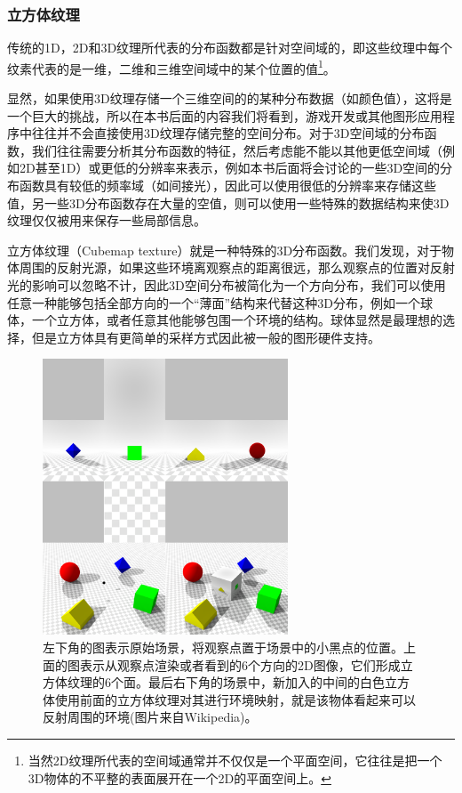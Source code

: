\subsubsection{立方体纹理}
传统的1D，2D和3D纹理所代表的分布函数都是针对空间域的，即这些纹理中每个纹素代表的是一维，二维和三维空间域中的某个位置的值\footnote{当然2D纹理所代表的空间域通常并不仅仅是一个平面空间，它往往是把一个3D物体的不平整的表面展开在一个2D的平面空间上。}。

显然，如果使用3D纹理存储一个三维空间的的某种分布数据（如颜色值），这将是一个巨大的挑战，所以在本书后面的内容我们将看到，游戏开发或其他图形应用程序中往往并不会直接使用3D纹理存储完整的空间分布。对于3D空间域的分布函数，我们往往需要分析其分布函数的特征，然后考虑能不能以其他更低空间域（例如2D甚至1D）或更低的分辨率来表示，例如本书后面将会讨论的一些3D空间的分布函数具有较低的频率域（如间接光），因此可以使用很低的分辨率来存储这些值，另一些3D分布函数存在大量的空值，则可以使用一些特殊的数据结构来使3D纹理仅仅被用来保存一些局部信息。

立方体纹理（Cubemap texture）就是一种特殊的3D分布函数。我们发现，对于物体周围的反射光源，如果这些环境离观察点的距离很远，那么观察点的位置对反射光的影响可以忽略不计，因此3D空间分布被简化为一个方向分布，我们可以使用任意一种能够包括全部方向的一个“薄面”结构来代替这种3D分布，例如一个球体，一个立方体，或者任意其他能够包围一个环境的结构。球体显然是最理想的选择，但是立方体具有更简单的采样方式因此被一般的图形硬件支持。

\begin{figure}
\sidecaption
	\includegraphics[width=0.65\textwidth]{figures/api/cube-map}
	\caption{左下角的图表示原始场景，将观察点置于场景中的小黑点的位置。上面的图表示从观察点渲染或者看到的6个方向的2D图像，它们形成立方体纹理的6个面。最后右下角的场景中，新加入的中间的白色立方体使用前面的立方体纹理对其进行环境映射，就是该物体看起来可以反射周围的环境(图片来自Wikipedia)。}
	\label{f:api-cube-map}
\end{figure}

